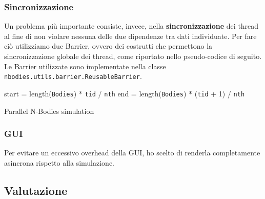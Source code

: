 \documentclass[12pt,a4paper,oneside]{article}
\begin{document}
	\subsubsection{Sincronizzazione}
	Un problema più importante consiste, invece, nella \textbf{sincronizzazione} dei thread al fine di non violare nessuna delle due dipendenze tra dati individuate. Per fare ciò utilizziamo due Barrier, ovvero dei costrutti che permettono la sincronizzazione globale dei thread, come riportato nello pseudo-codice di seguito. Le Barrier utilizzate sono implementate nella classe \texttt{nbodies.utils.barrier.ReusableBarrier}.
	
	\begin{algorithm}
		
		start = length(\texttt{Bodies}) * \texttt{tid} / \texttt{nth}\;
		end = length(\texttt{Bodies}) * (\texttt{tid} + 1) / \texttt{nth}\;
		\caption{Parallel N-Bodies simulation}
		\label{alg:sim-barrier}
	\end{algorithm}

	\subsubsection{GUI}
	Per evitare un eccessivo overhead della GUI, ho scelto di renderla completamente asincrona rispetto alla simulazione.
	
	\subsection{Valutazione}
\end{document}
